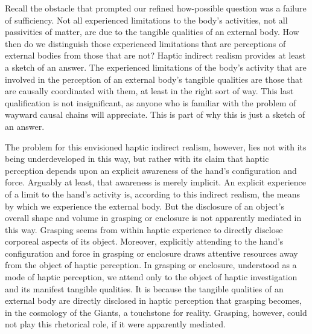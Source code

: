
Recall the obstacle that prompted our refined how-possible question was a failure of sufficiency. Not all experienced limitations to the body's activities, not all passivities of matter, are due to the tangible qualities of an external body. How then do we distinguish those experienced limitations that are perceptions of external bodies from those that are not? Haptic indirect realism provides at least a sketch of an answer. The experienced limitations of the body's activity that are involved in the perception of an external body's tangible qualities are those that are causally coordinated with them, at least in the right sort of way. This last qualification is not insignificant, as anyone who is familiar with the problem of wayward causal chains will appreciate. This is part of why this is just a sketch of an answer. 

The problem for this envisioned haptic indirect realism, however, lies not with its being underdeveloped in this way, but rather with its claim that haptic perception depends upon an explicit awareness of the hand's configuration and force. Arguably at least, that awareness is merely implicit. An explicit experience of a limit to the hand's activity is, according to this indirect realism, the means by which we experience the external body. But the disclosure of an object's overall shape and volume in grasping or enclosure is not apparently mediated in this way. Grasping seems from within haptic experience to directly disclose corporeal aspects of its object. Moreover, explicitly attending to the hand's configuration and force in grasping or enclosure draws attentive resources away from the object of haptic perception. In grasping or enclosure, understood as a mode of haptic perception, we attend only to the object of haptic investigation and its manifest tangible qualities. It is because the tangible qualities of an external body are directly disclosed in haptic perception that grasping becomes, in the cosmology of the Giants, a touchstone for reality. Grasping, however, could not play this rhetorical role, if it were apparently mediated.

